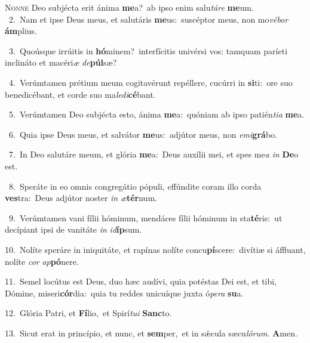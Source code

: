 \lettrine{\initial\textcolor{\initialcolor}{N}}{onne} Deo subjécta erit ánima \textbf{me}\-a?~\star ab ipso enim salu\-\textit{tá}\-\textit{re} \textbf{me}\-um.\\
{\numbfont\textcolor{\numbcolor}{~2.}}~Nam et ipse Deus meus, et salutáris \textbf{me}\-us:~\star suscéptor meus, non mo\-\textit{vé}\-\textit{bor} \textbf{ám}\-plius.\par
{\numbfont\textcolor{\numbcolor}{~3.}}~Quoúsque irrúitis in \textbf{hó}\-minem?~\star interfícitis univérsi vos: tamquam paríeti inclináto et macéri\textit{æ} \textit{de}\-\textbf{púl}sæ?\par
{\numbfont\textcolor{\numbcolor}{~4.}}~Verúmtamen prétium meum cogitavérunt repéllere, cucúrri in \textbf{si}\-ti:~\star ore suo benedicébant, et corde suo ma\-\textit{le}\-\textit{di}\textbf{cé}bant.\par
{\numbfont\textcolor{\numbcolor}{~5.}}~Verúmtamen Deo subjécta esto, ánima \textbf{me}\-a:~\star quóniam ab ipso patién\-\textit{ti}\-\textit{a} \textbf{me}\-a.\par
{\numbfont\textcolor{\numbcolor}{~6.}}~Quia ipse Deus meus, et salvátor \textbf{me}\-us:~\star adjútor meus, non \textit{e}\-\textit{mi}\textbf{grá}bo.\par
{\numbfont\textcolor{\numbcolor}{~7.}}~In Deo salutáre meum, et glória \textbf{me}\-a:~\star Deus auxílii mei, et spes me\textit{a} \textit{in} \textbf{De}\-o est.\par
{\numbfont\textcolor{\numbcolor}{~8.}}~Speráte in eo omnis congregátio pópuli, effúndite coram illo corda \textbf{ves}\-tra:~\star Deus adjútor noster \textit{in} \textit{æ}\-\textbf{tér}num.\par
{\numbfont\textcolor{\numbcolor}{~9.}}~Verúmtamen vani fílii hóminum, mendáces fílii hóminum in sta\-\textbf{té}\-ris:~\star ut decípiant ipsi de vanitáte \textit{in} \textit{id}\-\textbf{íp}sum.\par
{\numbfont\textcolor{\numbcolor}{10.}}~Nolíte speráre in iniquitáte, et rapínas nolíte concu\-\textbf{pí}\-scere:~\star divítiæ si áffluant, nolíte \textit{cor} \textit{ap}\-\textbf{pó}nere.\par
{\numbfont\textcolor{\numbcolor}{11.}}~Semel locútus est Deus, duo hæc audívi, quia potéstas Dei est, et tibi, Dómine, miseri\-\textbf{cór}\-dia:~\star quia tu reddes unicuíque juxta ó\-\textit{pe}\-\textit{ra} \textbf{su}\-a.\par
{\numbfont\textcolor{\numbcolor}{12.}}~Glória Patri, et \textbf{Fí}\-lio,~\star et Spirí\-\textit{tu}\-\textit{i} \textbf{Sanc}\-to.\par
{\numbfont\textcolor{\numbcolor}{13.}}~Sicut erat in princípio, et nunc, et \textbf{sem}\-per,~\star et in sǽcula sæcu\-\textit{ló}\-\textit{rum}. \textbf{A}\-men.\par
